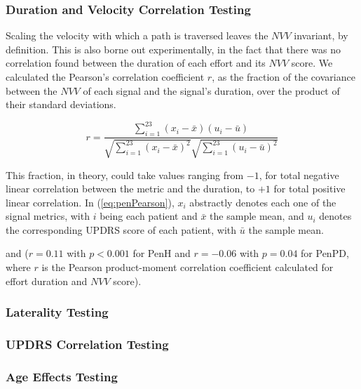 \subsubsection{Duration and Velocity Correlation Testing}
\label{subsubsec:PenCTDurVelCorTesting}
Scaling the velocity with which a path is traversed leaves the $NVV$ invariant, by definition. This is also borne out experimentally, in the fact that there was no correlation found between the duration of each effort and its $NVV$ score. We calculated the Pearson's correlation coefficient $r$, as the fraction of the covariance between the $NVV$ of each signal and the signal's duration, over the product of their standard deviations. 

\begin{equation} \label{eq:penPearson}
r = \frac{ \sum_{i=1}^{23} (x_{i} - \bar{x})(u_{i} - \bar{u}) } 
		 { \sqrt{\sum_{i=1}^{23} (x_{i} - \bar{x})^{2}} \sqrt{\sum_{i=1}^{23} (u_{i} - \bar{u})^{2}} }
\end{equation}

\noindent
This fraction, in theory, could take values ranging from $-1$, for total negative linear correlation between the metric and the duration, to $+1$ for total positive linear correlation. In (\ref{eq:penPearson}), $x_{i}$ abstractly denotes each one of the signal metrics, with $i$ being each patient and $\bar{x}$ the sample mean, and $u_{i}$ denotes the corresponding \gls{UPDRS} score of each patient, with $\bar{u}$ the sample mean.

and ($r=0.11$ with $p<0.001$ for \gls{PenH} and $r= -0.06$ with $p=0.04$ for \gls{PenPD}, where $r$ is the Pearson product-moment correlation coefficient calculated for effort duration and $NVV$ score). 

\subsubsection{Laterality Testing}
\label{subsubsec:PenCTLateralityTesting}

\subsubsection{UPDRS Correlation Testing}
\label{subsubsec:PenCTUPDRSCorTesting}

\subsubsection{Age Effects Testing}
\label{subsubsec:PenCTAgeEffectsTesting}

